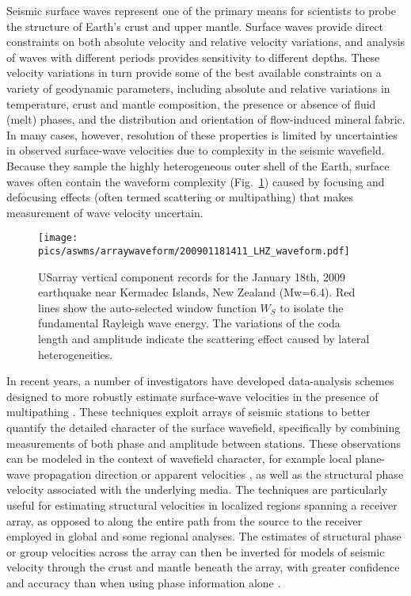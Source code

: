 Seismic surface waves represent one of the primary means for scientists to probe the structure of Earth's crust and upper mantle.  Surface waves provide direct constraints on both absolute velocity and relative velocity variations, and analysis of waves with different periods provides sensitivity to different depths.  These velocity variations in turn provide some of the best available constraints on a variety of geodynamic parameters, including absolute and relative variations in temperature, crust and mantle composition, the presence or absence of fluid (melt) phases, and the distribution and orientation of flow-induced mineral fabric.  In many cases, however, resolution of these properties is limited by uncertainties in observed surface-wave velocities due to complexity in the seismic wavefield.  Because they sample the highly heterogeneous outer shell of the Earth, surface waves often contain the waveform complexity (Fig.~\ref{fig:arraywaveform}) caused by focusing and defocusing effects (often termed scattering or multipathing) that makes measurement of wave velocity uncertain. 

\begin{figure}
	\texttt{[image: pics/aswms/arraywaveform/200901181411\_LHZ\_waveform.pdf]}	
	\caption{USarray vertical component records for the January 18th, 2009 earthquake near Kermadec Islands, New Zealand (Mw=6.4). Red lines show the auto-selected window function $W_S$ to isolate the fundamental Rayleigh wave energy. The variations of the coda length and amplitude indicate the scattering effect caused by lateral heterogeneities.}
	\label{fig:arraywaveform}
\end{figure}

In recent years, a number of investigators have developed data-analysis schemes designed to more robustly estimate surface-wave velocities in the presence of multipathing \citep[e.g.][]{Friederich:1995cea,Forsyth:2005id,Yang:2006fc,Lin:2009fx,Pollitz:2010gk,Lin:2011fw,Yang:2011kt}.  These techniques exploit arrays of seismic stations to better quantify the detailed character of the surface wavefield, specifically by combining measurements of both phase and amplitude between stations.  These observations can be modeled in the context of wavefield character, for example local plane-wave propagation direction \citep[e.g.,][]{Forsyth:2005id} or apparent velocities \citep{Lin:2009fx}, as well as the structural phase velocity associated with the underlying media. The techniques are particularly useful for estimating structural velocities in localized regions spanning a receiver array, as opposed to along the entire path from the source to the receiver employed in global \citep[e.g.,][]{Levshin:1992ve,Li:1996br,Ekstrom:1997ff} and some regional \citep[e.g.,][]{Chen:2007it,Tape:2010bm,Zhu:2012gm} analyses.  The estimates of structural phase or group velocities across the array can then be inverted for models of seismic velocity through the crust and mantle beneath the array, with greater confidence and accuracy than when using phase information alone \citep[e.g.,][]{Yang:2011kt,Rau:2011hc,Lin:2011fw,Pollitz:2010gk}.

